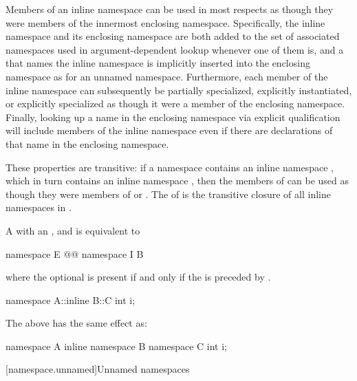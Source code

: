 \pnum
Members of an inline namespace can be used in most respects as though they were members
of the innermost enclosing namespace. Specifically, the inline namespace and its enclosing
namespace are both added to the set of associated namespaces used in
argument-dependent lookup whenever one of them is,
and a  that names the inline
namespace is implicitly inserted into the enclosing namespace as for an unnamed
namespace. Furthermore, each
member of the inline namespace can subsequently be partially
specialized, explicitly
instantiated, or explicitly specialized as
though it were a member of the enclosing namespace. Finally, looking up a name in the
enclosing namespace via explicit qualification will include
members of the inline namespace even if
there are declarations of that name in the enclosing namespace.

\pnum
These properties are transitive: if a namespace  contains an inline namespace
, which in turn contains an inline namespace , then the members of
 can be used as though they were members of  or .
The  of  is the transitive closure of all
inline namespaces in .

\pnum
A  with an
 ,
  and
 
is equivalent to
\begin{codeblock}
namespace E { @@ namespace I { B } }
\end{codeblock}
where the optional  is present if and only if
the   is preceded by .
\begin{example}
\begin{codeblock}
namespace A::inline B::C {
  int i;
}
\end{codeblock}
The above has the same effect as:
\begin{codeblock}
namespace A {
  inline namespace B {
    namespace C {
      int i;
    }
  }
}
\end{codeblock}
\end{example}

[namespace.unnamed]{Unnamed namespaces}%

